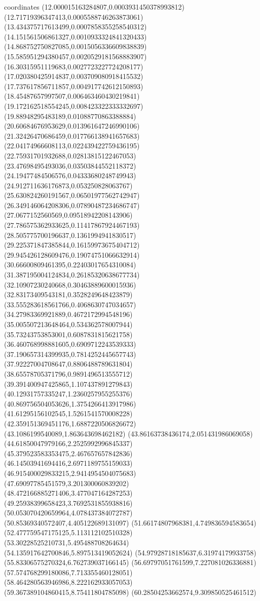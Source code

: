 coordinates {%
(12.000015163284807,0.0003931450378993812)
(12.71719396347413,0.0005588746263873061)
(13.434375717613499,0.0007858355258540312)
(14.151561506861327,0.0010933324841320433)
(14.868752750827085,0.0015056336609838839)
(15.585951294380457,0.0020529181568883907)
(16.30315951119683,0.0027723227724208177)
(17.020380425914837,0.003709080918415532)
(17.737617856711857,0.004917742612150893)
(18.45487657997507,0.006463460430219841)
(19.172162518554245,0.008423322333332697)
(19.88948295483189,0.01088770863388884)
(20.60684676953629,0.013961647246990106)
(21.32426470686459,0.017766138941657683)
(22.04174966608113,0.022439422759436195)
(22.75931701932688,0.02813815122467053)
(23.47698495493036,0.03503844552118372)
(24.19477484506576,0.04333680248749943)
(24.912711636176873,0.053250828063767)
(25.630824260191567,0.06501977562742947)
(26.349146064208306,0.07890487234686747)
(27.0677152560569,0.09518942208143906)
(27.786575362933625,0.11417867924467193)
(28.505775700196637,0.1361994941830517)
(29.225371847385844,0.16159973675404712)
(29.945426128609476,0.19074751066632914)
(30.66600809461395,0.22403017654310084)
(31.387195004124834,0.26185320638677734)
(32.10907230240668,0.30463889600015936)
(32.83173409543181,0.3528249648423879)
(33.555283618561766,0.4068630747034657)
(34.27983369921889,0.4672172994548196)
(35.005507213648464,0.534362578007944)
(35.73243753853001,0.6087831815621758)
(36.460768998881605,0.6909712243539333)
(37.190657314399935,0.7814252445657743)
(37.92227004708647,0.8806488789631804)
(38.65578705371796,0.9891496513555712)
(39.391400947425865,1.107437891279843)
(40.12931757335247,1.2360257955255376)
(40.869756504053626,1.3754266413917986)
(41.61295156102545,1.5261541570008228)
(42.359151369451176,1.6887220506826672)
(43.1086199540089,1.863643698462182)
(43.86163738436174,2.051431986069058)
(44.61850047979166,2.2525992996845337)
(45.379523583353475,2.467657657842836)
(46.14503941694416,2.6971189755159033)
(46.915400029833215,2.9414954504075683)
(47.69097785451579,3.201300060839202)
(48.472166885271406,3.477047164287253)
(49.25938399658423,3.7692531855938816)
(50.053070420659964,4.078437384072787)
(50.85369340572407,4.405122689131097)
(51.66174807968381,4.749836594583654)
(52.477759547175125,5.113112102510328)
(53.30228525210731,5.495488708264634)
(54.135917642700846,5.897513419052624)
(54.97928718185637,6.31974179933758)
(55.83306575270324,6.762739037166145)
(56.69797051761599,7.227081026336881)
(57.574768299180086,7.713355460128051)
(58.464280563946986,8.222162933057053)
(59.367389104860415,8.75411804785098)
(60.28504253662574,9.309850525461512)
}
